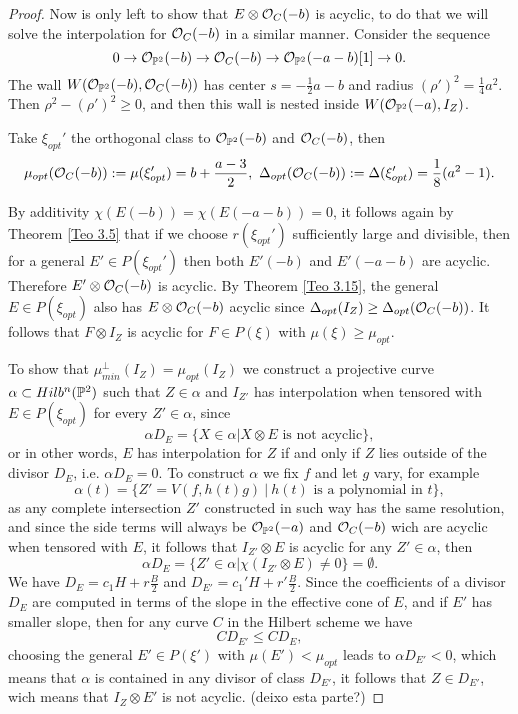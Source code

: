 \documentclass[
	oldfontcommands,
	sumario=abnt-6027-2012,
	12pt,			%
	openright,		%
	oneside,		%
	a4paper,		%
	english,		%
	brazil			%
	]{imecc-unicamp}
\begin{document}
\begin{proof}
	Now is only left to show that $E\otimes {\mathcal O}_C(-b)$ is acyclic, to do that we will solve the interpolation for ${\mathcal O}_C(-b)$ in a similar manner. Consider the sequence $$
	0\rightarrow {\mathcal O}_{{\mathbb P}^2}(-b)\rightarrow {\mathcal O}_C(-b)\rightarrow {\mathcal O}_{{\mathbb P}^2}(-a-b)[1]\rightarrow 0.
	$$
	The wall $W({\mathcal O}_{{\mathbb P}^2}(-b),{\mathcal O}_C(-b))$ has center $s=-\frac{1}{2}a-b$ and radius $(\rho')^2=\frac{1}{4}a^2$. Then $\rho^2-(\rho')^2\geq0$, and then this wall is nested inside $W({\mathcal O}_{{\mathbb P}^2}(-a),I_Z)$. 
	
	Take $\xi_{opt}'$ the orthogonal class to ${\mathcal O}_{{\mathbb P}^2}(-b)$ and ${\mathcal O}_C(-b)$, then $$
	\mu_{opt}({\mathcal O}_C(-b)):=\mu(\xi_{opt}')=b+\frac{a-3}{2}, ~\Delta_{opt}({\mathcal O}_C(-b)):=\Delta(\xi_{opt}')=\frac{1}{8}(a^2-1).
	$$
	
	By additivity $\chi(E(-b))=\chi(E(-a-b))=0$, it follows again by Theorem \ref{Teo 3.5} that if we choose $r(\xi_{opt}')$ sufficiently large and divisible, then for a general $E'\in P(\xi_{opt}')$ then both $E'(-b)$ and $E'(-a-b)$ are acyclic. Therefore $E'\otimes {\mathcal O}_C(-b)$ is acyclic. By Theorem \ref{Teo 3.15}, the general $E\in P(\xi_{opt})$ also has $ E\otimes {\mathcal O}_C(-b)$ acyclic since $\Delta_{opt}(I_Z)\geq\Delta_{opt}({\mathcal O}_C(-b))$. It follows that $F\otimes I_Z$ is acyclic for $F\in P(\xi)$ with $\mu(\xi)\geq\mu_{opt}$.
	
	To show that $\mu^\perp_{min}(I_Z)=\mu_{opt}(I_Z)$ we construct a projective curve $\alpha\subset Hilb^n({\mathbb P}^2)$ such that $Z\in \alpha$ and $I_{Z'}$ has interpolation when tensored with $E\in P(\xi_{opt})$ for every $Z'\in \alpha$, since $$
	\alpha D_E=\{X\in\alpha|X\otimes E \text{ is not acyclic} \},
	$$ 
	or in other words, $E$ has interpolation for $Z$ if and only if $Z$ lies outside of the divisor $D_E$, i.e. $ \alpha D_E=0$. To construct $\alpha$ we fix $f$ and let $g$ vary, for example $$
	\alpha(t)=\{Z'=V(f,h(t)g)~|~h(t) \text{ is a polynomial in } t  \},
	$$ as any complete intersection $Z'$ constructed in such way has the same resolution, and since the side terms will always be ${\mathcal O}_{{\mathbb P}^2}(-a)$ and ${\mathcal O}_C(-b)$ wich are acyclic when tensored with $E$, it follows that $I_{Z'}\otimes E$ is acyclic for any $Z'\in\alpha$, then $$\alpha D_{E}=\{Z'\in\alpha|\chi(I_{Z'}\otimes E)\neq0\}=\emptyset.$$
	We have $D_E=c_1H+r\frac{B}{2}$ and $D_{E'}=c_1'H+r'\frac{B}{2}$. Since the coefficients of a divisor $D_E$ are computed in terms of the slope in the effective cone of $E$, and if $E'$ has smaller slope, then for any curve $C$ in the Hilbert scheme we have $$CD_{E'}\le CD_E, $$ choosing the general $E'\in P(\xi')$ with $\mu(E')<\mu_{opt}$ leads to $\alpha D_{E'}<0$, which means that $\alpha$ is contained in any divisor of class $D_{E'}$, it follows that $Z\in D_{E'}$, wich means that $I_Z\otimes E'$ is not acyclic.  
	(deixo esta parte?)
\end{proof}
\end{document}

